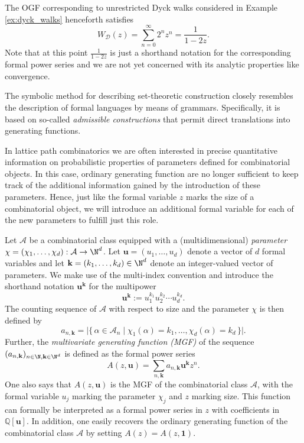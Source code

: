 \begin{example}
  The OGF corresponding to unrestricted Dyck walks considered in Example \ref{ex:dyck_walks} henceforth satisfies
  $$
    W_\mathcal{D}(z) = \sum_{n = 0}^\infty 2^n z^n = \frac{1}{1 - 2z}.
  $$
  Note that at this point $\frac{1}{1 - 2z}$ is just a shorthand notation for the corresponding formal power series and we are not yet concerned with its analytic properties like convergence.
\end{example}

The symbolic method for describing set-theoretic construction closely resembles the description of formal languages by means of grammars. Specifically, it is based on so-called \textit{admissible constructions} that permit direct translations into generating functions.

In lattice path combinatorics we are often interested in precise quantitative information on probabilistic properties of parameters defined for combinatorial objects. In this case, ordinary generating function are no longer sufficient to keep track of the additional information gained by the introduction of these parameters. 
Hence, just like the formal variable $z$ marks the size of a combinatorial object, we will introduce an additional formal variable for each of the new parameters to fulfill just this role.

\begin{definition}
  Let $\mathcal{A}$ be a combinatorial class equipped with a (multidimensional) \textit{parameter} $\chi = (\chi_1,\dots,\chi_d): \mathcal{A} \to \N^d$. Let $\textbf{u} = (u_1,\dots,u_d)$ denote a vector of $d$ formal variables and let $\textbf{k} = (k_1,\dots,k_d) \in \N^d$ denote an integer-valued vector of parameters. We make use of the multi-index convention and introduce the shorthand notation $\textbf{u}^\textbf{k}$ for the multipower
  $$
    \textbf{u}^\textbf{k} := u_1^{k_1} u_2^{k_2} \cdots u_d^{k_d}.
  $$
  The counting sequence of $\mathcal{A}$ with respect to size and the parameter $\chi$ is then defined by
  $$
    a_{n,\textbf{k}} = \big|\{\, \alpha \in \mathcal{A}_n \mid \chi_1(\alpha) = k_1, \dots, \chi_d(\alpha) = k_d \,\}\big|.
  $$
  Further, the \textit{multivariate generating function (MGF)} of the sequence $(a_{n,\textbf{k}})_{n \in \N, \textbf{k} \in \N^d}$ is defined as the formal power series
  $$
    A(z,\textbf{u}) = \sum_{n, \textbf{k}} a_{n,\textbf{k}}\textbf{u}^{\textbf{k}} z^n. 
  $$
  One also says that $A(z,\textbf{u})$ is the MGF of the combinatorial class $\mathcal{A}$, with the formal variable $u_j$ marking the parameter $\chi_j$ and $z$ marking size.
  This function can formally be interpreted as a formal power series in $z$ with coefficients in $\mathbb{Q}[\textbf{u}]$.
  In addition, one easily recovers the ordinary generating function of the combinatorial class $\mathcal{A}$ by setting $A(z) = A(z,\textbf{1}).$
\end{definition}

